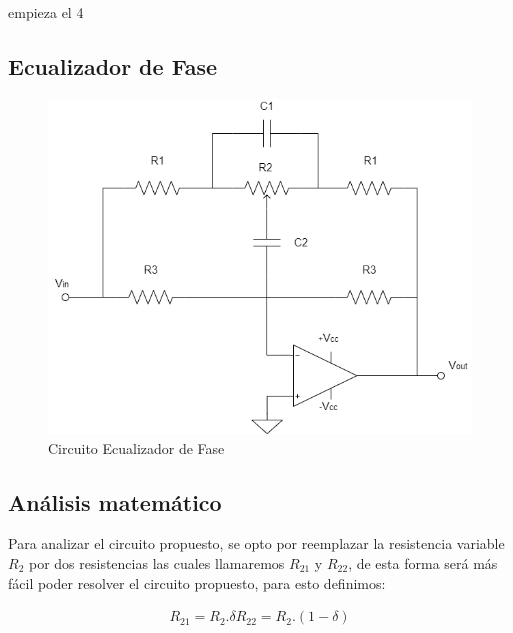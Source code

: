 empieza el 4

\subsection{Ecualizador de Fase}


\begin{figure}[H]
	\caption{Circuito Ecualizador de Fase}
	\centering
	\includegraphics[scale=1]{Informe/Ecualizador de Fase.png}
\end{figure}


\subsection{Análisis matemático}

Para analizar el circuito propuesto, se opto por reemplazar la resistencia variable $R_2$ por dos resistencias las cuales llamaremos $R_{21}$ y $R_{22}$, de esta forma será más fácil poder resolver el circuito propuesto, para esto definimos:

\begin{align}

	\begin{equation}
		R_{21} = R_2 . \delta
	\end{equation}

	\begin{equation}
		R_{22}= R_2 . (1 - \delta)
	\end{equation}

\end{align}


